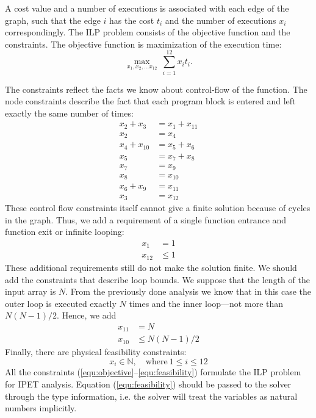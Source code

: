 \documentclass[12pt,a4paper,titlepage,oneside]{article}
\begin{document}
\begin{itemize}
A cost value and a number of executions is associated with each edge of the graph, such that the edge $i$ has the cost $t_i$ and the number of executions $x_i$ correspondingly.
The ILP problem consists of the objective function and the constraints.
The objective function is maximization of the execution time:
\begin{equation}
\max_{x_1, x_2, \ldots x_{12}} \ \sum_{i=1}^{12} x_i t_i.
\label{equ:objective}
\end{equation}

The constraints reflect the facts we know about control-flow of the function.
The node constraints describe the fact that each program block is entered and left exactly the same number of times:
\begin{equation}
	\left.\begin{aligned}
		x_2 + x_3	&= x_1 + x_{11}\\
		x_2			&= x_4\\
		x_4 + x_{10}	&= x_5 + x_6\\
		x_5			&= x_7 + x_8\\
		x_7			&= x_9\\
		x_8			&= x_{10}\\
		x_6 + x_9	&= x_{11}\\
		x_3			&= x_{12}
	\end{aligned}\right.
\label{equ:node}
\end{equation}
These control flow constraints itself cannot give a finite solution because of cycles in the graph.
Thus, we add a requirement of a single function entrance and function exit or infinite looping:
\begin{equation}
	\left.\begin{aligned}
		x_1			&= 1\\
		x_{12}		&\leq 1
	\end{aligned}\right.
\label{equ:single}
\end{equation}
These additional requirements still do not make the solution finite.
We should add the constraints that describe loop bounds.
We suppose that the length of the input array is $N$.
From the previously done analysis we know that in this case the outer loop is executed exactly $N$ times and the inner loop---not more than $N(N-1)/2$.
Hence, we add
\begin{equation}
	\left.\begin{aligned}
		x_{11}		&= N\\
		x_{10}		&\leq N(N-1)/2
	\end{aligned}\right.
\label{equ:loops}
\end{equation}
Finally, there are physical feasibility constraints:
\begin{equation}
		x_i \in \mathbb{N}, \quad \mathrm{where}\ 1 \leq i \leq 12
\label{equ:feasibility}
\end{equation}
All the constraints (\ref{equ:objective}--\ref{equ:feasibility}) formulate the ILP problem for IPET analysis.
Equation (\ref{equ:feasibility}) should be passed to the solver through the type information, i.e. the solver will treat the variables as natural numbers implicitly.


\end{itemize}
\end{document}
